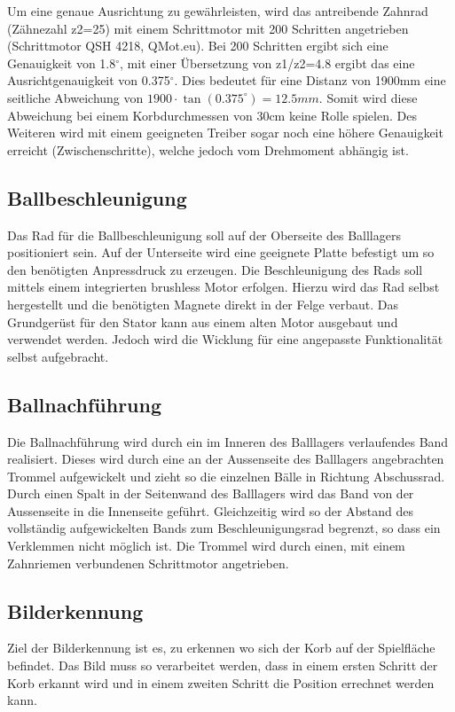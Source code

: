 Um eine genaue Ausrichtung zu gewährleisten, wird das antreibende Zahnrad 
(Zähnezahl z2=25) mit einem Schrittmotor mit 200 Schritten angetrieben (Schrittmotor QSH 4218, 
QMot.eu). Bei 200 Schritten ergibt sich eine Genauigkeit von 1.8$^\circ$, mit einer 
Übersetzung von z1/z2=4.8 ergibt das eine Ausrichtgenauigkeit von 0.375$^\circ$. Dies 
bedeutet für eine Distanz von 1900mm eine seitliche Abweichung von 
$1900 \cdot \tan(0.375^\circ)= 12.5mm$. Somit wird diese Abweichung bei einem 
Korbdurchmessen von 30cm keine Rolle spielen. Des Weiteren wird mit einem 
geeigneten Treiber sogar noch eine höhere Genauigkeit erreicht 
(Zwischenschritte), welche jedoch vom Drehmoment abhängig ist. 

\subsection{Ballbeschleunigung}
Das Rad für die Ballbeschleunigung soll auf der Oberseite des Balllagers 
positioniert sein. Auf der Unterseite wird eine geeignete Platte befestigt um 
so den benötigten Anpressdruck zu erzeugen. 
Die Beschleunigung des Rads soll mittels einem integrierten brushless Motor erfolgen. Hierzu wird das Rad selbst hergestellt und die benötigten Magnete direkt in der Felge verbaut. Das Grundgerüst für den Stator kann aus einem alten Motor ausgebaut und verwendet werden. Jedoch wird die Wicklung für eine angepasste Funktionalität selbst aufgebracht.

\subsection{Ballnachführung}
Die Ballnachführung wird durch ein im Inneren des Balllagers verlaufendes Band 
realisiert. Dieses wird durch eine an der Aussenseite des Balllagers 
angebrachten Trommel aufgewickelt und zieht so die einzelnen Bälle in Richtung 
Abschussrad. Durch einen Spalt in der Seitenwand des Balllagers wird das Band 
von der Aussenseite in die Innenseite geführt. Gleichzeitig wird so der 
Abstand des vollständig aufgewickelten Bands zum Beschleunigungsrad begrenzt, 
so dass ein Verklemmen nicht möglich ist.
Die Trommel wird durch einen, mit einem Zahnriemen verbundenen Schrittmotor angetrieben.

\subsection{Bilderkennung}
Ziel der Bilderkennung ist es, zu erkennen wo sich der Korb auf der Spielfläche befindet. Das Bild muss so verarbeitet werden, dass in einem ersten Schritt der Korb erkannt wird und in einem zweiten Schritt die Position errechnet werden kann.
